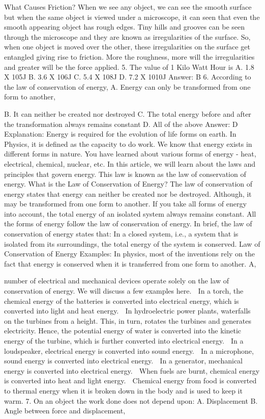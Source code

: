 What Causes Friction?
When we see any object, we can see the smooth surface but when
the same object is viewed under a microscope, it can seen that even
the smooth appearing object has rough edges. Tiny hills and grooves
can be seen through the microscope and they are known as
irregularities of the surface.
So, when one object is moved over the other, these irregularities on
the surface get entangled giving rise to friction. More the
roughness, more will the irregularities and greater will be the force
applied.
5. The value of 1 Kilo Watt Hour is
A. 1.8 X 105J
B. 3.6 X 106J
C. 5.4 X 108J
D. 7.2 X 1010J
Answer: B
6. According to the law of conservation of energy,
A. Energy can only be transformed from one form to another, 


B. It can neither be created nor destroyed
C. The total energy before and after the transformation always
remains constant
D. All of the above
Answer: D
Explanation: Energy is required for the evolution of life forms on
earth. In Physics, it is defined as the capacity to do work. We know
that energy exists in different forms in nature. You have learned
about various forms of energy - heat, electrical, chemical, nuclear,
etc. In this article, we will learn about the laws and principles that
govern energy. This law is known as the law of conservation of
energy.
What is the Law of Conservation of Energy?
The law of conservation of energy states that energy can neither be
created nor be destroyed. Although, it may be transformed from
one form to another. If you take all forms of energy into account,
the total energy of an isolated system always remains constant. All
the forms of energy follow the law of conservation of energy. In
brief, the law of conservation of energy states that: In a closed
system, i.e., a system that is isolated from its surroundings, the
total energy of the system is conserved.
Law of Conservation of Energy Examples:
In physics, most of the inventions rely on the fact that energy is
conserved when it is transferred from one form to another. A, 


number of electrical and mechanical devices operate solely on the
law of conservation of energy. We will discuss a few examples here.
 In a torch, the chemical energy of the batteries is converted
into electrical energy, which is converted into light and heat
energy.
 In hydroelectric power plants, waterfalls on the turbines from
a height. This, in turn, rotates the turbines and generates
electricity. Hence, the potential energy of water is converted
into the kinetic energy of the turbine, which is further
converted into electrical energy.
 In a loudspeaker, electrical energy is converted into sound
energy.
 In a microphone, sound energy is converted into electrical
energy.
 In a generator, mechanical energy is converted into electrical
energy.
 When fuels are burnt, chemical energy is converted into heat
and light energy.
 Chemical energy from food is converted to thermal energy
when it is broken down in the body and is used to keep it warm.
7. On an object the work done does not depend upon:
A. Displacement
B. Angle between force and displacement, 


